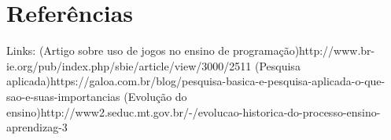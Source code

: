 \documentclass[12pt]{article}
\begin{document}
	\section{Referências} 
	
	Links: 	(Artigo sobre uso de jogos no ensino de programação)http://www.br-ie.org/pub/index.php/sbie/article/view/3000/2511
			(Pesquisa aplicada)https://galoa.com.br/blog/pesquisa-basica-e-pesquisa-aplicada-o-que-sao-e-suas-importancias
			(Evolução do ensino)http://www2.seduc.mt.gov.br/-/evolucao-historica-do-processo-ensino-aprendizag-3
	
	
	
\end{document}
